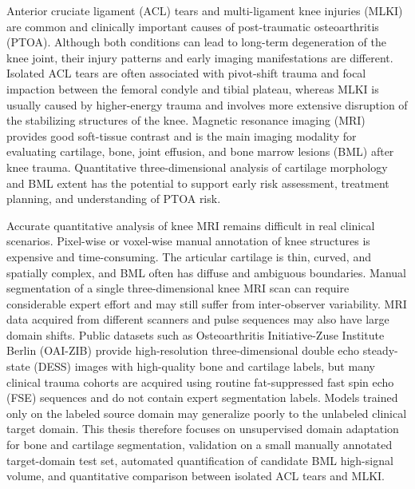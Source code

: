 
\begin{digest}
  Anterior cruciate ligament (ACL) tears and multi-ligament knee injuries (MLKI) are common and clinically important causes of post-traumatic osteoarthritis (PTOA). Although both conditions can lead to long-term degeneration of the knee joint, their injury patterns and early imaging manifestations are different. Isolated ACL tears are often associated with pivot-shift trauma and focal impaction between the femoral condyle and tibial plateau, whereas MLKI is usually caused by higher-energy trauma and involves more extensive disruption of the stabilizing structures of the knee. Magnetic resonance imaging (MRI) provides good soft-tissue contrast and is the main imaging modality for evaluating cartilage, bone, joint effusion, and bone marrow lesions (BML) after knee trauma. Quantitative three-dimensional analysis of cartilage morphology and BML extent has the potential to support early risk assessment, treatment planning, and understanding of PTOA risk.

  Accurate quantitative analysis of knee MRI remains difficult in real clinical scenarios. Pixel-wise or voxel-wise manual annotation of knee structures is expensive and time-consuming. The articular cartilage is thin, curved, and spatially complex, and BML often has diffuse and ambiguous boundaries. Manual segmentation of a single three-dimensional knee MRI scan can require considerable expert effort and may still suffer from inter-observer variability. MRI data acquired from different scanners and pulse sequences may also have large domain shifts. Public datasets such as Osteoarthritis Initiative-Zuse Institute Berlin (OAI-ZIB) provide high-resolution three-dimensional double echo steady-state (DESS) images with high-quality bone and cartilage labels, but many clinical trauma cohorts are acquired using routine fat-suppressed fast spin echo (FSE) sequences and do not contain expert segmentation labels. Models trained only on the labeled source domain may generalize poorly to the unlabeled clinical target domain. This thesis therefore focuses on unsupervised domain adaptation for bone and cartilage segmentation, validation on a small manually annotated target-domain test set, automated quantification of candidate BML high-signal volume, and quantitative comparison between isolated ACL tears and MLKI.


\end{digest}

